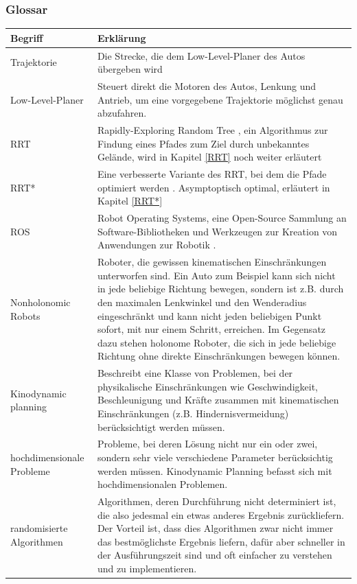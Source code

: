 \subsubsection{Glossar}
\begin{tabularx}{\textwidth}{l|X}
 \textbf{Begriff}  & \textbf{Erklärung}  \\
\hline Trajektorie & Die Strecke, die dem Low-Level-Planer des Autos übergeben wird\\
Low-Level-Planer & Steuert direkt die Motoren des Autos, Lenkung und Antrieb, um eine vorgegebene Trajektorie möglichst genau abzufahren. \\
RRT & Rapidly-Exploring Random Tree \citep{Lav98}, ein Algorithmus zur Findung eines Pfades zum Ziel durch unbekanntes Gelände, wird in Kapitel \ref{RRT} noch weiter erläutert\\
RRT* & Eine verbesserte Variante des RRT, bei dem die Pfade optimiert werden \citep{KaFra10}. Asymptoptisch optimal, erläutert in Kapitel \ref{RRT*} \\
ROS & Robot Operating Systems, eine Open-Source Sammlung an Software-Bibliotheken und Werkzeugen zur Kreation von Anwendungen zur Robotik \citep{ROS}. \\
Nonholonomic Robots & Roboter, die gewissen kinematischen Einschränkungen unterworfen sind. Ein Auto zum Beispiel kann sich nicht in jede beliebige Richtung bewegen, sondern ist z.B. durch den maximalen Lenkwinkel und den Wenderadius eingeschränkt und kann nicht jeden beliebigen Punkt sofort, mit nur einem Schritt, erreichen. Im Gegensatz dazu stehen holonome Roboter, die sich in jede beliebige Richtung ohne direkte Einschränkungen bewegen können.  \\
Kinodynamic planning & Beschreibt eine Klasse von Problemen, bei der physikalische Einschränkungen wie Geschwindigkeit, Beschleunigung und Kräfte zusammen mit kinematischen Einschränkungen (z.B. Hindernisvermeidung) berücksichtigt werden müssen. \\
hochdimensionale Probleme & Probleme, bei deren Lösung nicht nur ein oder zwei, sondern sehr viele verschiedene Parameter berücksichtig werden müssen. Kinodynamic Planning befasst sich mit hochdimensionalen Problemen.\\
randomisierte Algorithmen & Algorithmen, deren Durchführung nicht determiniert ist, die also jedesmal ein etwas anderes Ergebnis zurückliefern. Der Vorteil ist, dass dies Algorithmen zwar nicht immer das bestmöglichste Ergebnis liefern, dafür aber schneller in der Ausführungszeit sind und oft einfacher zu verstehen und zu implementieren.\\
\end{tabularx} 

